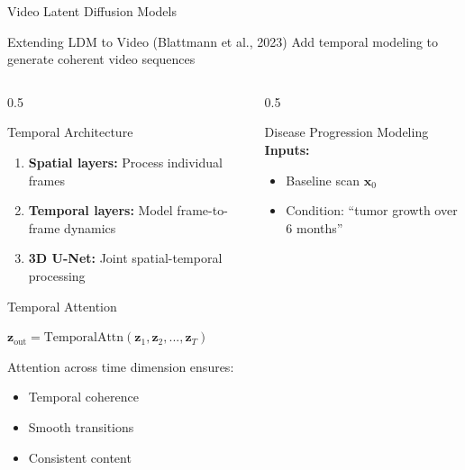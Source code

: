 \documentclass[aspectratio=169]{beamer}
\begin{document}
\begin{frame}{Video Latent Diffusion Models}
    \begin{block}{Extending LDM to Video (Blattmann et al., 2023)}
        Add temporal modeling to generate coherent video sequences
    \end{block}
    
    \begin{columns}
        \begin{column}{0.5\textwidth}
            \begin{block}{Temporal Architecture}
                \begin{enumerate}
                    \item \textbf{Spatial layers:} Process individual frames
                    \item \textbf{Temporal layers:} Model frame-to-frame dynamics
                    \item \textbf{3D U-Net:} Joint spatial-temporal processing
                \end{enumerate}
            \end{block}
            
            \begin{block}{Temporal Attention}
                \begin{center}
                    $\mathbf{z}_{\text{out}} = \text{TemporalAttn}(\mathbf{z}_1, \mathbf{z}_2, ..., \mathbf{z}_T)$
                \end{center}
                Attention across time dimension ensures:
                \begin{itemize}
                    \item Temporal coherence
                    \item Smooth transitions
                    \item Consistent content
                \end{itemize}
            \end{block}
        \end{column}
        \begin{column}{0.5\textwidth}
            \begin{block}{Disease Progression Modeling}
                \textbf{Inputs:}
                \begin{itemize}
                    \item Baseline scan $\mathbf{x}_0$
                    \item Condition: ``tumor growth over 6 months''
                \end{itemize}
                

\end{block}
\end{column}
\end{columns}
\end{frame}
\end{document}
